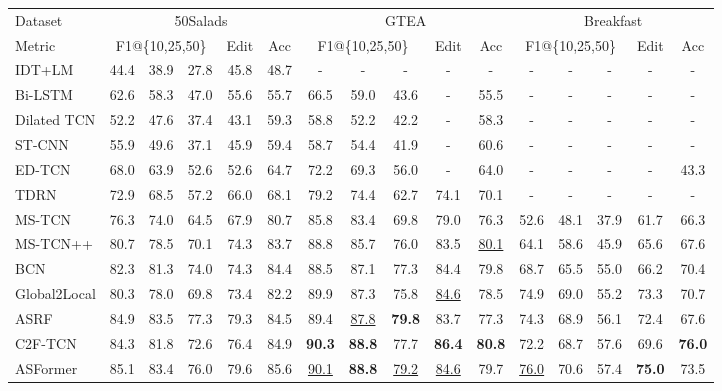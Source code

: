 \documentclass[letterpaper]{article} \usepackage[submission]{aaai23}  \usepackage{times}  \usepackage{helvet}  \usepackage{courier}  \usepackage[hyphens]{url}  \usepackage{graphicx} \urlstyle{rm} \def\UrlFont{\rm}  \usepackage{natbib}  \usepackage{caption} \frenchspacing  \setlength{\pdfpagewidth}{8.5in} \setlength{\pdfpageheight}{11in} \usepackage{algorithm}
\begin{document}
\begin{table*}[t]
\centering
\small
\begin{tabular}{l|ccccc|ccccc|ccccc}
\toprule
Dataset & \multicolumn{5}{c|}{50Salads} & \multicolumn{5}{c|}{GTEA} & \multicolumn{5}{c}{Breakfast} \\
\cmidrule{2-16}   Metric & \multicolumn{3}{c}{F1@\{10,25,50\}} & Edit & Acc & \multicolumn{3}{c}{F1@\{10,25,50\}} & Edit & Acc & \multicolumn{3}{c}{F1@\{10,25,50\}} & Edit & Acc \\
\midrule
IDT+LM      & 44.4 & 38.9 & 27.8 & 45.8 & 48.7 & - & - &  - & - & - & - & - & - & - & -\\
Bi-LSTM     & 62.6 & 58.3 & 47.0 & 55.6 & 55.7 & 66.5 & 59.0 & 43.6 & - & 55.5 & - & - & - & - & -\\
Dilated TCN & 52.2 & 47.6 & 37.4 & 43.1 & 59.3 & 58.8 & 52.2 & 42.2 & - & 58.3 & - & - & - & - & -\\
ST-CNN      & 55.9 & 49.6 & 37.1 & 45.9 & 59.4 & 58.7 & 54.4 & 41.9 & - & 60.6 & - & - & - & - & -\\
ED-TCN      & 68.0 & 63.9 & 52.6 & 52.6 & 64.7 & 72.2 & 69.3 & 56.0 & - & 64.0 & - & - & - & - & 43.3\\
TDRN        & 72.9 & 68.5 & 57.2 & 66.0 & 68.1 & 79.2 & 74.4 & 62.7 & 74.1 & 70.1 & - & - & - & - & -\\
MS-TCN      & 76.3 & 74.0 & 64.5 & 67.9 & 80.7 & 85.8 & 83.4 & 69.8 & 79.0 & 76.3 & 52.6 & 48.1 & 37.9 & 61.7 & 66.3\\
MS-TCN++    & 80.7 & 78.5 & 70.1 & 74.3 & 83.7 & 88.8 & 85.7 & 76.0 & 83.5 & \underline{80.1} & 64.1 & 58.6 & 45.9 & 65.6 & 67.6\\
BCN         & 82.3 & 81.3 & 74.0 & 74.3 & 84.4 & 88.5 & 87.1 & 77.3 & 84.4 & 79.8 & 68.7 & 65.5 & 55.0 & 66.2 & 70.4\\
Global2Local& 80.3 & 78.0 & 69.8 & 73.4 & 82.2 & 89.9 & 87.3 & 75.8 & \underline{84.6} & 78.5 & 74.9 & 69.0 & 55.2 & 73.3 & 70.7\\
ASRF        & 84.9 & 83.5 & 77.3 & 79.3 & 84.5 & 89.4 & \underline{87.8} & \textbf{79.8} & 83.7 & 77.3 & 74.3 & 68.9 & 56.1 & 72.4 & 67.6\\
C2F-TCN     & 84.3 & 81.8 & 72.6 & 76.4 & 84.9 & \textbf{90.3} & \textbf{88.8} & 77.7 & \textbf{86.4} & \textbf{80.8} & 72.2 & 68.7 & 57.6 & 69.6 & \textbf{76.0} \\
ASFormer    & 85.1 & 83.4 & 76.0 & 79.6 & 85.6 & \underline{90.1} & \textbf{88.8} & \underline{79.2} & \underline{84.6} & 79.7 & \underline{76.0} & 70.6 & 57.4 & \textbf{75.0} & 73.5\\

\end{tabular}
\end{table*}
\end{document}
